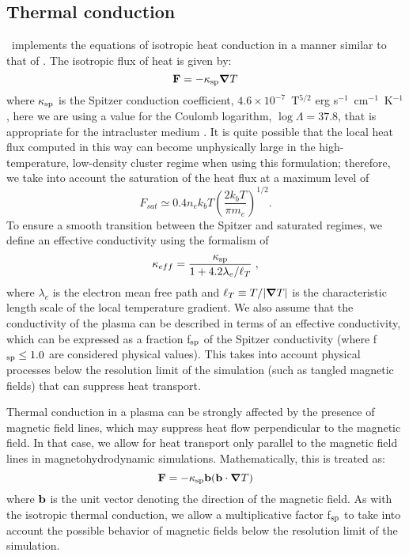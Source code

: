 \subsection{Thermal conduction}
\label{sec.num.conductions}

\enzo\ implements the equations of isotropic heat conduction in a manner
similar to that of \citet{2007ApJ...664..135P}.  
The isotropic flux of heat is given by:
\begin{equation}
\myvec{F} = -\kappa_{\rm sp} \grad T
\end{equation}
where $\kappa_{\rm sp}$ is the Spitzer conduction coefficient, $4.6 \times 10^{-7}$~T$^{5/2}$ erg
s$^{-1}$~cm$^{-1}$~K$^{-1}$ \citep{1962pfig.book.....S}, here we are using a
value for the Coulomb logarithm, $\log \Lambda = 37.8$, that is
appropriate for the intracluster medium \citep{1988xrec.book.....S}.
It is quite possible that the local heat flux computed in this way 
can become unphysically large in
the high-temperature, low-density cluster regime when using this
formulation; therefore, we take into account the saturation of the heat
flux \citep{1977ApJ...211..135C} at a maximum level of
\begin{equation}
F_{sat} \simeq 0.4 n_e k_b T \left( \frac{2 k_b T}{\pi m_e} \right)^{1/2}.
\end{equation}
To ensure a smooth transition between
the Spitzer and saturated regimes, we define an effective
conductivity using the formalism of \citet{1988xrec.book.....S}
\begin{equation}
\kappa_{eff} = \frac{\kappa_{\rm sp}}{1 + 4.2 \lambda_e / \ell_T} \; ,
\end{equation}
where $\lambda_e$ is the electron mean free path and $\ell_T \equiv T
/ |\bm{\nabla} T|$ is the characteristic length scale of the local
temperature gradient.  We also assume that the conductivity of the
plasma can be described in terms of an effective conductivity, which
can be expressed as a fraction f$_{\rm sp}$ of the Spitzer conductivity
(where f$_{\rm sp} \leq 1.0$ are considered physical values).  This takes
into account physical processes below the resolution limit of the
simulation (such as tangled magnetic fields) that can suppress heat
transport.

Thermal conduction in a plasma can be strongly affected by the
presence of magnetic field lines, which may suppress heat
flow perpendicular to the magnetic field.  In that case, we allow for
heat transport only parallel to the magnetic field lines in
magnetohydrodynamic simulations.  Mathematically, this is treated as:
\begin{equation}
\myvec{F} = -\kappa_{\rm sp} \myvec{b} (\myvec{b} \cdot \grad T)
\end{equation}
where $\mathbf{b}$ is the unit vector denoting the direction of the
magnetic field.  As with the isotropic thermal conduction, we allow a
multiplicative factor f$_{\rm sp}$ to take into account the possible
behavior of magnetic fields below the resolution limit of the
simulation.


